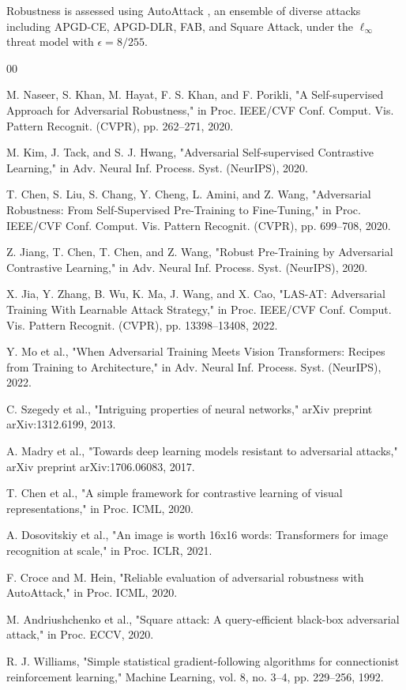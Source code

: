 \documentclass[conference]{IEEEtran}
\begin{document}
Robustness is assessed using AutoAttack \cite{b11}, an ensemble of diverse attacks including APGD-CE, APGD-DLR, FAB, and Square Attack, under the $\ell_\infty$ threat model with $\epsilon = 8/255$.



\begin{thebibliography}{00}

 M. Naseer, S. Khan, M. Hayat, F. S. Khan, and F. Porikli,
"A Self-supervised Approach for Adversarial Robustness,"
in Proc. IEEE/CVF Conf. Comput. Vis. Pattern Recognit. (CVPR), pp. 262--271, 2020.

 M. Kim, J. Tack, and S. J. Hwang,
"Adversarial Self-supervised Contrastive Learning,"
in Adv. Neural Inf. Process. Syst. (NeurIPS), 2020.

 T. Chen, S. Liu, S. Chang, Y. Cheng, L. Amini, and Z. Wang,
"Adversarial Robustness: From Self-Supervised Pre-Training to Fine-Tuning,"
in Proc. IEEE/CVF Conf. Comput. Vis. Pattern Recognit. (CVPR), pp. 699--708, 2020.

 Z. Jiang, T. Chen, T. Chen, and Z. Wang,
"Robust Pre-Training by Adversarial Contrastive Learning,"
in Adv. Neural Inf. Process. Syst. (NeurIPS), 2020.

 X. Jia, Y. Zhang, B. Wu, K. Ma, J. Wang, and X. Cao,
"LAS-AT: Adversarial Training With Learnable Attack Strategy,"
in Proc. IEEE/CVF Conf. Comput. Vis. Pattern Recognit. (CVPR), pp. 13398--13408, 2022.

 Y. Mo et al.,
"When Adversarial Training Meets Vision Transformers: Recipes from Training to Architecture,"
in Adv. Neural Inf. Process. Syst. (NeurIPS), 2022.

 C. Szegedy et al.,
"Intriguing properties of neural networks,"
arXiv preprint arXiv:1312.6199, 2013.

 A. Madry et al.,
"Towards deep learning models resistant to adversarial attacks,"
arXiv preprint arXiv:1706.06083, 2017.

 T. Chen et al.,
"A simple framework for contrastive learning of visual representations,"
in Proc. ICML, 2020.

 A. Dosovitskiy et al.,
"An image is worth 16x16 words: Transformers for image recognition at scale,"
in Proc. ICLR, 2021.

 F. Croce and M. Hein,
"Reliable evaluation of adversarial robustness with AutoAttack,"
in Proc. ICML, 2020.

 M. Andriushchenko et al.,
"Square attack: A query-efficient black-box adversarial attack,"
in Proc. ECCV, 2020.

 R. J. Williams,
"Simple statistical gradient-following algorithms for connectionist reinforcement learning,"
Machine Learning, vol. 8, no. 3--4, pp. 229--256, 1992.

\end{thebibliography}
\end{document}
